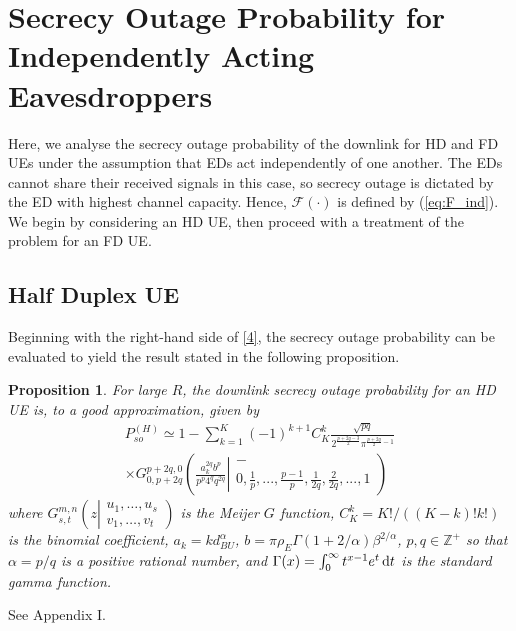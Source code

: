 \documentclass[10pt]{IEEEtran}
\newtheorem{prop}[thm]{Proposition}
\begin{document}
\section{Secrecy Outage Probability for Independently Acting Eavesdroppers} \label{se:III}
Here, we analyse the secrecy outage probability of the downlink for HD and FD UEs under the assumption that EDs act independently of one another.  The EDs cannot share their received signals in this case, so secrecy outage is dictated by the ED with highest channel capacity.  Hence, $\mathcal F(\cdot)$ is defined by (\ref{eq:F_ind}).  We begin by considering an HD UE, then proceed with a treatment of the problem for an FD UE.

\subsection{Half Duplex UE}
Beginning with the right-hand side of \eqref{4}, the secrecy outage probability can be evaluated to yield the result stated in the following proposition.

\begin{prop}\label{prop1}
For large $R$, the downlink secrecy outage probability for an HD UE is, to a good approximation, given by
\begin{multline}\label{10}
P^{(H)}_{so} \simeq 1-\sum_{k=1}^K(-1)^{k+1}C^k_K\frac{\sqrt{pq}}{2^{\frac{p+2q-3}{2}}\pi^{\frac{p+2q}{2}-1}} \\
\times{G}_{0,p+2q}^{p+2q,0}\!\left(\frac{a_k^{2q}b^p}{p^p4^qq^{2q}}\left|
\begin{array}{c}
  - \\
  0,\frac{1}{p},...,\frac{p-1}{p},\frac{1}{2q},\frac{2}{2q},...,1
\end{array}
\right.
\right)
\end{multline}
where $G_{s,t}^{m,n}\left(z\left|
\begin{array}{c}
  u_1,\ldots,u_s \\
  v_1,\ldots,v_t
\end{array}
\right.
\right)$ is the Meijer $G$ function, $C^{k}_{K}=K!/((K-k)!k!)$ is the binomial coefficient, $a_k = kd^\alpha_{BU}$, $b = \pi\rho_E\Gamma(1+{2}/{\alpha})\beta^{2/\alpha}$, $p,q\in \mathbb{Z}^+$ so that $\alpha = p/q$ is a positive rational number, and $\Gamma(x) = \int_0^\infty t^{x-1} e^t\,{\rm d} t$ is the standard gamma function.
\end{prop}
\begin{IEEEproof}
  See Appendix I.
\end{IEEEproof}
\end{document}
